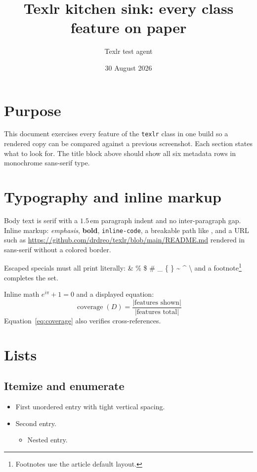 \documentclass{texlr}
\title{Texlr kitchen sink: every class feature on paper}
\author{Texlr test agent}
\date{30 August 2026}
\begin{document}
\maketitle

\section{Purpose}

This document exercises every feature of the \texttt{texlr} class in one
build so a rendered copy can be compared against a previous screenshot. Each
section states what to look for. The title block above should show all six
metadata rows in monochrome sans-serif type.

\section{Typography and inline markup}

Body text is serif with a \(1.5\)\,em paragraph indent and no inter-paragraph
gap. Inline markup: \emph{emphasis}, \textbf{bold}, \texttt{inline-code},
a breakable path like , and a URL
such as \url{https://github.com/drdreo/texlr/blob/main/README.md} rendered in
sans-serif without a colored border.

Escaped specials must all print literally: \& \% \$ \# \_ \{ \}
\textasciitilde{} \textasciicircum{} \textbackslash{} and a
footnote\footnote{Footnotes use the article default layout.} completes the set.

Inline math \(e^{i\pi} + 1 = 0\) and a displayed equation:
\begin{equation}
  \operatorname{coverage}(D) = \frac{\lvert \text{features shown} \rvert}
                                    {\lvert \text{features total} \rvert}
  \label{eq:coverage}
\end{equation}
Equation~\ref{eq:coverage} also verifies cross-references.

\section{Lists}

\subsection{Itemize and enumerate}

\begin{itemize}
  \item First unordered entry with tight vertical spacing.
  \item Second entry.
  \begin{itemize}
    \item Nested entry.
  \end{itemize}
\end{itemize}
\end{document}

